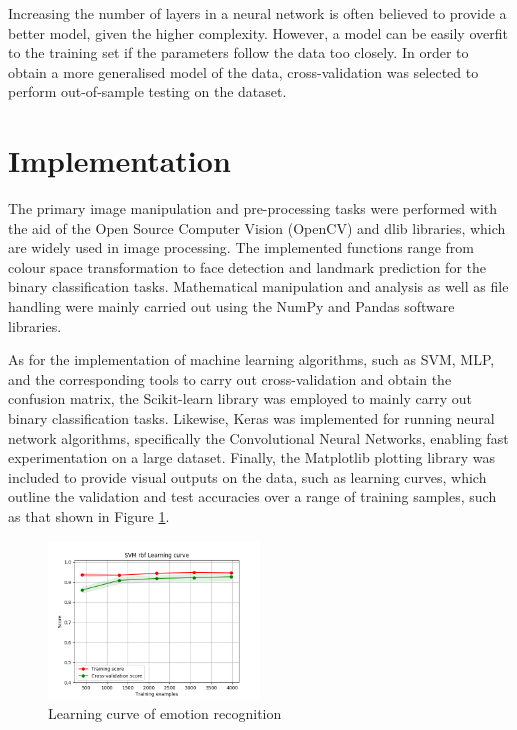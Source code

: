 \documentclass[conference]{IEEEtran}
\begin{document}
Increasing the number of layers in a neural network is often believed to provide a better model, given the higher complexity. However, a model can be easily overfit to the training set if the parameters follow the data too closely.
In order to obtain a more generalised model of the data, cross-validation was selected to perform out-of-sample testing on the dataset.

\section{Implementation} \label{s-implement}


The primary image manipulation and pre-processing tasks were performed with the aid of the Open Source Computer Vision (OpenCV) and dlib libraries, which are widely used in image processing. The implemented functions range from colour space transformation to face detection and landmark prediction for the binary classification tasks. 
Mathematical manipulation and analysis as well as file handling were mainly carried out using the NumPy and Pandas software libraries.

As for the implementation of machine learning algorithms, such as SVM, MLP, and the corresponding tools to carry out cross-validation and obtain the confusion matrix, the Scikit-learn library was employed to mainly carry out binary classification tasks. 
Likewise, Keras was implemented for running neural network algorithms, specifically the Convolutional Neural Networks, enabling fast experimentation on a large dataset.
Finally, the Matplotlib plotting library was included to provide visual outputs on the data, such as learning curves, which outline the validation and test accuracies over a range of training samples, such as that shown in Figure \ref{fig: T1-LC}.

\begin{figure} [h] %
  \centering
    \includegraphics[width=0.5\textwidth]{graphs/T1_SVM_RBF} 
    \caption{Learning curve of emotion recognition}
    \label{fig: T1-LC}
\end{figure}
\end{document}
